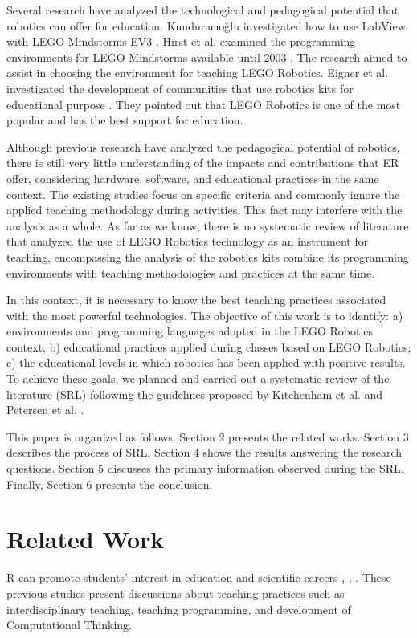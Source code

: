 \documentclass[conference]{IEEEtran}
\begin{document}
Several research have analyzed the technological and pedagogical potential that robotics can offer for education. Kunduracıoğlu investigated how to use LabView with LEGO Mindstorms EV3 \cite{Kunduracıoglu}. Hirst et al. examined the programming environments for LEGO Mindstorms available until 2003 \cite{Hirst}. The research aimed to assist in choosing the environment for teaching LEGO Robotics. Eigner et al. investigated the development of communities that use robotics kits for educational purpose \cite{Eigner}. They pointed out that LEGO Robotics is one of the most popular and has the best support for education.

Although previous research have analyzed the pedagogical potential of robotics, there is still very little understanding of the impacts and contributions that ER offer, considering hardware, software, and educational practices in the same context. The existing studies focus on specific criteria and commonly ignore the applied teaching methodology during activities. This fact may interfere with the analysis as a whole. As far as we know, there is no systematic review of literature that analyzed the use of LEGO Robotics technology as an instrument for teaching, encompassing the analysis of the robotics kits combine its programming environments with teaching methodologies and practices at the same time.

In this context, it is necessary to know the best teaching practices associated with the most powerful technologies. The objective of this work is to identify: a) environments and programming languages adopted in the LEGO Robotics context; b) educational practices applied during classes based on LEGO Robotics; c) the educational levels in which robotics has been applied with positive results. To achieve these goals, we planned and carried out a systematic review of the literature (SRL) following the guidelines proposed by Kitchenham et al. \cite{Kitchenham} and Petersen et al. \cite{Petersen}. 

This paper is organized as follows. Section 2 presents the related works. Section 3 describes the process of SRL. Section 4 shows the results answering the research questions. Section 5 discusses the primary information observed during the SRL. Finally, Section 6 presents the conclusion.


\section{Related Work}
R can promote students’ interest in education and scientific careers \cite{Bers}, \cite{Ospennikova}, \cite{Rogers} \cite{Lupetti}. These previous studies present discussions about teaching practices such as interdisciplinary teaching, teaching programming, and development of Computational Thinking.
\end{document}
